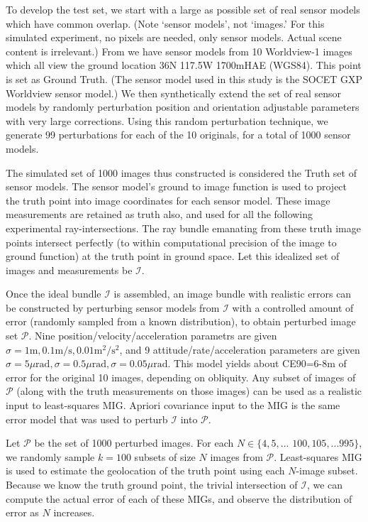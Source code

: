 \documentclass[10pt]{amsart}
\newcommand{\Iimg}{\mathcal{I}}
\newcommand{\Pimg}{\mathcal{P}}
\begin{document}
To develop the test set, we start with a large as possible set of real sensor
models which have common overlap. (Note `sensor models', not `images.' For
this simulated experiment, no pixels are needed, only sensor models. Actual
scene content is irrelevant.)  From \cite{MIN} we have sensor models from 10
Worldview-1 images which all view the ground location 36N 117.5W 1700mHAE
(WGS84). This point is set as Ground Truth. (The sensor model used in this study
is the SOCET GXP \cite{SGXP} Worldview sensor model.) We then synthetically
extend the set of real sensor models by randomly perturbation position and
orientation adjustable parameters with very large corrections. Using this random
perturbation technique, we generate 99 perturbations for each of the 10
originals, for a total of 1000 sensor models.

The simulated set of 1000 images thus constructed is considered the Truth set of
sensor models. The sensor model's ground to image function is used to project
the truth point into image coordinates for each sensor model. These image
measurements are retained as truth also, and used for all the following
experimental ray-intersections. The ray bundle emanating from these truth image
points intersect perfectly (to within computational precision of the image to
ground function) at the truth point in ground space. Let this idealized set of
images and measurements be $\Iimg$.

Once the ideal bundle $\Iimg$ is assembled, an image bundle with realistic
errors can be constructed by perturbing sensor models from $\Iimg$ with a
controlled amount of error (randomly sampled from a known distribution), to
obtain perturbed image set $\Pimg$. Nine position/velocity/ac\-cel\-eration
parametrs are given $\sigma = 1{\mathrm m}, 0.1{\mathrm m}/{\mathrm s},
0.01{\mathrm m}^2/{\mathrm s}^2$, and 9 attitude/rate/acceleration parameters
are given
$\sigma=5\mu\mathrm{rad}, \sigma=0.5\mu\mathrm{rad}, \sigma=0.05\mu\mathrm{rad}$.
This model yields about CE90=6-8m of error for the original 10 images, depending
on obliquity. Any subset of images of $\Pimg$ (along with the truth measurements
on those images) can be used as a realistic input to least-squares MIG. Apriori
covariance input to the MIG is the same error model that was used to perturb
$\Iimg$ into $\Pimg$.

Let $\Pimg$ be the set of 1000 perturbed images. For each
$N\in\{4,5,...$ $100,105,...995\}$, we randomly sample $k=100$ subsets of size
$N$ images from $\Pimg$. Least-squares MIG is used to estimate the geolocation
of the truth point using each $N$-image subset. Because we know the truth ground
point, the trivial intersection of $\Iimg$, we can compute the actual error of
each of these MIGs, and observe the distribution of error as $N$ increases.
\end{document}
